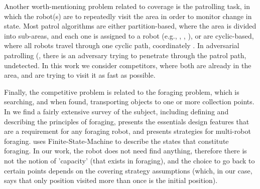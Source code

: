 Another worth-mentioning problem related to coverage is the patrolling task, in which the robot(s) are to repeatedly visit the area in order to monitor change in state. Most patrol algorithms are either partition-based, where the area is divided into sub-areas, and each one is assigned to a robot (e.g., \cite{guo2004towards}, \cite{guo2004coverage}, \cite{jung2002tracking}), or are cyclic-based, where all robots travel through one cyclic path, coordinately \cite{chevaleyre2004theoretical}. 
In adversarial patrolling (\cite{agmon2011multi, sless2014multi, agmon2008multi}, there is an adversary trying to penetrate through the patrol path, undetected. In this work we consider competitors, where both are already in the area, and are trying to visit it as fast as possible.

Finally, the competitive problem is related to the foraging problem, which is searching, and when found, transporting objects to one or more collection points. In \cite{winfield2009foraging} we find a fairly extensive survey of the subject, including defining and describing the principles of foraging, presents the essentials design features that are a requirement for any foraging robot, and presents strategies for multi-robot foraging. \cite{winfield2009foraging} uses Finite-State-Machine to describe the states that constitute foraging. In our work, the robot does not need find anything, therefore there is not the notion of 'capacity' (that exists in foraging), and the choice to go back to certain points depends on the covering strategy assumptions (which, in our case, says that only position visited more than once is the initial position).